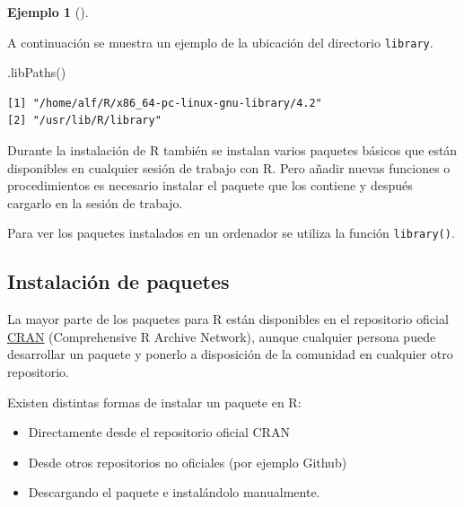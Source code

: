 \documentclass[
  a4paper,
]{scrreport}
\newenvironment{Shaded}{\begin{snugshade}}{\end{snugshade}}
\newcommand{\FunctionTok}[1]{\textcolor[rgb]{0.28,0.35,0.67}{#1}}
\newcommand{\NormalTok}[1]{\textcolor[rgb]{0.00,0.23,0.31}{#1}}
\providecommand{\tightlist}{%
  \setlength{\itemsep}{0pt}\setlength{\parskip}{0pt}}\usepackage{longtable,booktabs,array}
\theoremstyle{definition}
\theoremstyle{definition}
\newtheorem{example}{Ejemplo}[chapter]
\theoremstyle{remark}
\begin{document}
\leavevmode{}%
\begin{example}[]\label{exm-ubiacion-biblioteca-paquetes}

A continuación se muestra un ejemplo de la ubicación del directorio
\texttt{library}.

\begin{Shaded}
\begin{Highlighting}[]
\FunctionTok{.libPaths}\NormalTok{()}
\end{Highlighting}
\end{Shaded}

\begin{verbatim}
[1] "/home/alf/R/x86_64-pc-linux-gnu-library/4.2"
[2] "/usr/lib/R/library"                         
\end{verbatim}

\end{example}

Durante la instalación de R también se instalan varios paquetes básicos
que están disponibles en cualquier sesión de trabajo con R. Pero añadir
nuevas funciones o procedimientos es necesario instalar el paquete que
los contiene y después cargarlo en la sesión de trabajo.

Para ver los paquetes instalados en un ordenador se utiliza la función
\texttt{library()}.

\hypertarget{instalaciuxf3n-de-paquetes}{%
\subsection{Instalación de paquetes}\label{instalaciuxf3n-de-paquetes}}

La mayor parte de los paquetes para R están disponibles en el
repositorio oficial
\href{Comprehensive\%20R\%20Archive\%20Network}{CRAN} (Comprehensive R
Archive Network), aunque cualquier persona puede desarrollar un paquete
y ponerlo a disposición de la comunidad en cualquier otro repositorio.

Existen distintas formas de instalar un paquete en R:

\begin{itemize}
\tightlist
\item
  Directamente desde el repositorio oficial CRAN
\item
  Desde otros repositorios no oficiales (por ejemplo Github)
\item
  Descargando el paquete e instalándolo manualmente.
\end{itemize}
\end{document}
